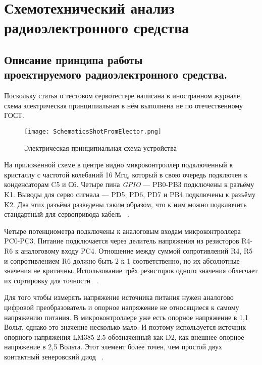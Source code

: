 \section{Схемотехнический анализ \\
  радиоэлектронного средства}


\subsection{Описание принципа работы \\
  проектируемого радиоэлектронного средства.}

Поскольку статья о тестовом сервотестере написана в иностранном
журнале, схема электрическая принципиальная в нём выполнена не по
отечественному ГОСТ.

\begin{figure}[H]
  \centering
  \texttt{[image: SchematicsShotFromElector.png]}
  \caption{Электрическая принципиальная схема устройства}
\end{figure}

На приложенной схеме в центре видно микроконтроллер подключенный к
кристаллу с частотой колебаний 16 Мгц, который в свою очередь
подключен к конденсаторам C5 и С6. Четыре пина \textit{GPIO} — PB0-PB3
подключены к разъёму K1. Выводы для серво сигнала — PD5, PD6, PD7 и
PB4 подключены к разъёму K2. Два этих разъёма разведены таким
образом, что к ним можно подключить стандартный для сервопривода
кабель ~\cite{Elector521}.

Четыре потенциометра подключены к аналоговым входам микроконтроллера
PC0-PC3. Питание подключается через делитель напряжения из резисторов
R4-R6 к аналоговому входу PC4. Отношение между суммой сопротивлений
R4, R5 и сопротивлением R6 должно быть 2 к 1 соответственно, но их
абсолютные значения не критичны. Использование трёх резисторов одного
значения облегчает их сортировку для точности ~\cite{Elector521}.

Для того чтобы измерять напряжение источника питания нужен аналогово
цифровой преобразователь и опорное напряжение не относящиеся к самому
напряжению питания.  В микроконтроллере уже есть опорное напряжение в
1,1 Вольт, однако это значение несколько мало. И поэтому используется
источник опорного напряжения LM385-2.5 обозначенный как D2, как
внешнее опорное напряжение в 2,5 Вольта. Этот элемент более точен, чем
простой двух контактный зенеровский диод ~\cite{Elector521}.

